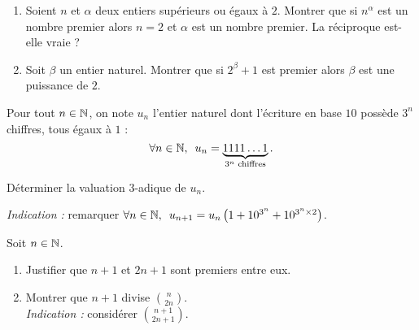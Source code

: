 \begin{corr}
\end{corr}

\begin{exo}[Exercice 7]
\begin{enumerate}
\item Soient \(n\) et \(\alpha\) deux entiers supérieurs ou égaux à \(2\). Montrer que si \(n^\alpha\) est un nombre premier alors \(n=2\) et \(\alpha\) est un nombre premier. La réciproque est-elle vraie ? \\

\item Soit \(\beta\) un entier naturel. Montrer que si \(2^\beta+1\) est premier alors \(\beta\) est une puissance de \(2\).
\end{enumerate}
\end{exo}

\begin{corr}
\end{corr}

\begin{exo}[Exercice 8]
Pour tout \(n\in\mathbb{N}\), on note \(u_n\) l'entier naturel dont l'écriture en base \(10\) possède \(3^n\) chiffres, tous égaux à \(1\) : \[\quantifs{\forall n\in\N}u_n=\underbrace{1111\dots1}_{3^n\text{ chiffres}}.\]

Déterminer la valuation \(3\)-adique de \(u_n\).

\textit{Indication :} remarquer \(\quantifs{\forall n\in\N}u_{n+1}=u_n\paren{1+10^{3^n}+10^{3^n\times2}}\).
\end{exo}

\begin{corr}
\end{corr}

\begin{exo}[Exercice 9]
Soit \(n\in\mathbb{N}\).

\begin{enumerate}
\item Justifier que \(n+1\) et \(2n+1\) sont premiers entre eux. \\

\item Montrer que \(n+1\) divise \(\binom{n}{2n}\). \\

\textit{Indication :} considérer \(\binom{n+1}{2n+1}\).
\end{enumerate}
\end{exo}


